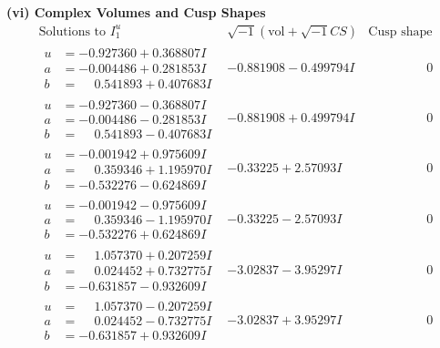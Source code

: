 \documentclass[1p]{elsarticle_modified}
\theoremstyle{definition}
\newcommand{\I}{\sqrt{-1}}
\begin{document}
\newpage\flushleft \textbf{(vi) Complex Volumes and Cusp Shapes}
$$\begin{array}{c|c|c}  
\text{Solutions to }I^u_{1}& \I (\text{vol} + \sqrt{-1}CS) & \text{Cusp shape}\\
 \hline 
\begin{aligned}
u &= -0.927360 + 0.368807 I \\
a &= -0.004486 + 0.281853 I \\
b &= \phantom{-}0.541893 + 0.407683 I\end{aligned}
 & -0.881908 - 0.499794 I & \phantom{-0.000000 } 0 \\ \hline\begin{aligned}
u &= -0.927360 - 0.368807 I \\
a &= -0.004486 - 0.281853 I \\
b &= \phantom{-}0.541893 - 0.407683 I\end{aligned}
 & -0.881908 + 0.499794 I & \phantom{-0.000000 } 0 \\ \hline\begin{aligned}
u &= -0.001942 + 0.975609 I \\
a &= \phantom{-}0.359346 + 1.195970 I \\
b &= -0.532276 - 0.624869 I\end{aligned}
 & -0.33225 + 2.57093 I & \phantom{-0.000000 } 0 \\ \hline\begin{aligned}
u &= -0.001942 - 0.975609 I \\
a &= \phantom{-}0.359346 - 1.195970 I \\
b &= -0.532276 + 0.624869 I\end{aligned}
 & -0.33225 - 2.57093 I & \phantom{-0.000000 } 0 \\ \hline\begin{aligned}
u &= \phantom{-}1.057370 + 0.207259 I \\
a &= \phantom{-}0.024452 + 0.732775 I \\
b &= -0.631857 - 0.932609 I\end{aligned}
 & -3.02837 - 3.95297 I & \phantom{-0.000000 } 0 \\ \hline\begin{aligned}
u &= \phantom{-}1.057370 - 0.207259 I \\
a &= \phantom{-}0.024452 - 0.732775 I \\
b &= -0.631857 + 0.932609 I\end{aligned}
 & -3.02837 + 3.95297 I & \phantom{-0.000000 } 0 \\ \hline\begin{aligned}

\end{aligned}
\end{array}$$
\end{document}
